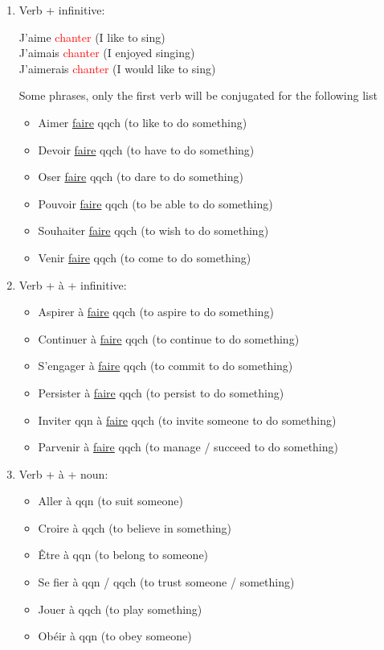 \documentclass{book}
\begin{document}
\begin{enumerate}
    \item Verb + infinitive:
    \begin{center}
        J'aime \textcolor{red}{chanter} (I like to sing) \\
        J'aimais \textcolor{red}{chanter} (I enjoyed singing) \\
        J'aimerais \textcolor{red}{chanter} (I would like to sing)
    \end{center}
    Some phrases, only the first verb will be conjugated for the following list
    \begin{itemize}
        \item Aimer \underline{faire} qqch (to like to do something) 
        \item Devoir \underline{faire} qqch (to have to do something) 
        \item Oser \underline{faire} qqch (to dare to do something) 
        \item Pouvoir \underline{faire} qqch (to be able to do something) 
        \item Souhaiter \underline{faire} qqch (to wish to do something)
        \item Venir \underline{faire} qqch (to come to do something)
    \end{itemize}

    \item Verb + à + infinitive:
    \begin{itemize}
        \item Aspirer à \underline{faire} qqch (to aspire to do something)
        \item Continuer à \underline{faire} qqch (to continue to do something)
        \item S'engager à \underline{faire} qqch (to commit to do something)
        \item Persister à \underline{faire} qqch (to persist to do something)
        \item Inviter qqn à \underline{faire} qqch (to invite someone to do something)
        \item Parvenir à \underline{faire} qqch (to manage / succeed to do something)
    \end{itemize}

    \item Verb + à + noun:
    \begin{itemize}
        \item Aller à qqn (to suit someone)
        \item Croire à qqch (to believe in something)
        \item Être à qqn (to belong to someone)
        \item Se fier à qqn / qqch (to trust someone / something)
        \item Jouer à qqch (to play something)
        \item Obéir à qqn (to obey someone) 
    \end{itemize}


\end{enumerate}
\end{document}
